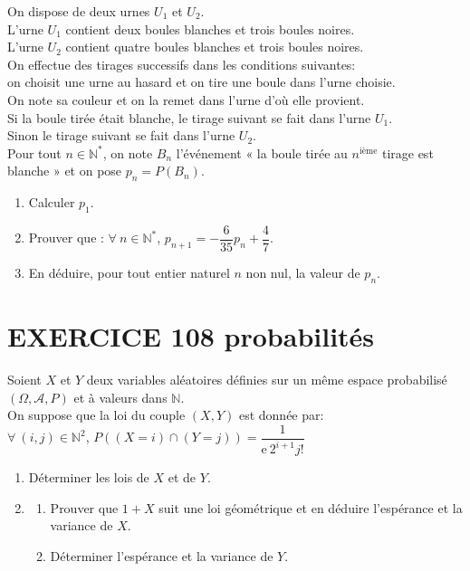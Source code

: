 \documentclass[10pt,oneside]{article}
\begin{document}
\begin{flushleft}
On dispose de deux urnes $U_1$ et $U_2$.\\
L'urne $U_1$ contient deux boules blanches et trois boules noires.\\
L'urne $U_2$ contient quatre boules blanches et trois boules noires.\\
On effectue des tirages successifs dans les conditions suivantes:\\
on choisit une urne au hasard et on tire une boule dans l'urne choisie.\\
On note sa couleur et on la remet dans l'urne d'où elle provient.\\
Si la boule tirée était blanche, le tirage suivant se fait dans l'urne $U_1$.\\
Sinon le tirage suivant se fait dans l'urne $U_2$.\\
Pour tout  $n\in\mathbb{N}^*$, on note $B_n$ l'événement « la boule tirée au $n^{\text{ième}}$ tirage est blanche »
et on pose $p_n=P(B_n)$.
\begin{enumerate}
\item
Calculer $p_1$.
\item
Prouver que : $\forall\:n\in\mathbb{N}^*$, $p_{n+1}=-\dfrac{6}{35}p_n+\dfrac{4}{7}$.
\item
En déduire, pour tout entier naturel $n$ non nul, la valeur de $p_n$.
\end{enumerate}

\section*{EXERCICE 108 \:probabilités}


Soient $X$ et $Y$ deux variables aléatoires définies sur un même espace probabilisé $(\Omega,\mathcal{A},P)$ et à valeurs dans $\mathbb{N}$.\\
On suppose que la loi du couple $(X,Y)$ est donnée par:\\
 $\forall\:(i,j)\in\mathbb{N}^2$, $P((X=i)\cap (Y=j))=\dfrac{1}{\mathrm{e}\:2^{i+1}j!}$
\begin{enumerate}


\item
Déterminer les lois de $X$ et de $Y$.
\item
\begin{enumerate}
\item 
Prouver que $1+X$ suit une loi géométrique et en déduire l'espérance et la variance de $X$.
\item
Déterminer l'espérance et la variance de $Y$.
\end{enumerate}


\end{enumerate}
\end{flushleft}
\end{document}
